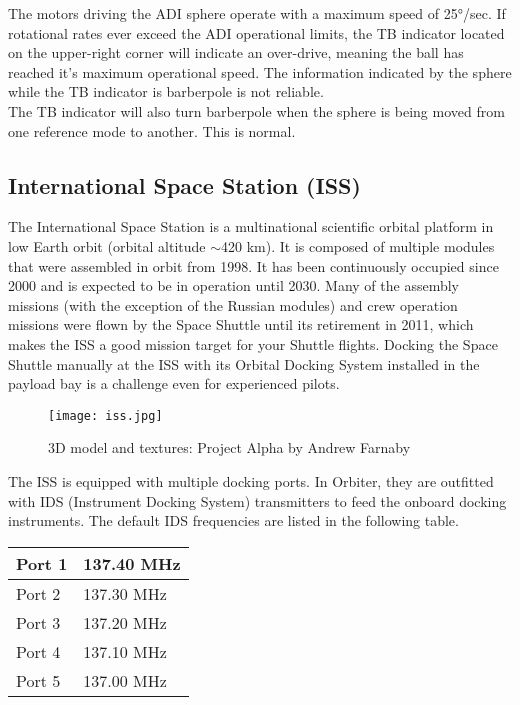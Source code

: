 \documentclass[Orbiter User Manual.tex]{subfiles}
\begin{document}
\noindent
The motors driving the ADI sphere operate with a maximum speed of 25°/sec. If rotational rates ever exceed the ADI operational limits, the TB indicator located on the upper-right corner will indicate an over-drive, meaning the ball has reached it's maximum operational speed. The information indicated by the sphere while the TB indicator is barberpole is not reliable.\\
The TB indicator will also turn barberpole when the sphere is being moved from one reference mode to another. This is normal.





\subsection{International Space Station (ISS)}
The International Space Station is a multinational scientific orbital platform in low Earth orbit (orbital altitude $\sim$420 km). It is composed of multiple modules that were assembled in orbit from 1998. It has been continuously occupied since 2000 and is expected to be in operation until 2030. Many of the assembly missions (with the exception of the Russian modules) and crew operation missions were flown by the Space Shuttle until its retirement in 2011, which makes the ISS a good mission target for your Shuttle flights. Docking the Space Shuttle manually at the ISS with its Orbital Docking System installed in the payload bay is a challenge even for experienced pilots.

\begin{figure}[H]
  \centering
  \texttt{[image: iss.jpg]}
  \caption{3D model and textures: Project Alpha by Andrew Farnaby}
\end{figure}

\noindent
The ISS is equipped with multiple docking ports. In Orbiter, they are outfitted with IDS (Instrument Docking System) transmitters to feed the onboard docking instruments. The default IDS frequencies are listed in the following table.

	\begin{longtable}{ |p{}|p{}| }
	\hline\rule{0pt}{2ex}
	Port 1 & 137.40  MHz\\
	\hline\rule{0pt}{2ex}
	Port 2 & 137.30  MHz\\
	\hline\rule{0pt}{2ex}
	Port 3 & 137.20  MHz\\
	\hline\rule{0pt}{2ex}
	Port 4 & 137.10  MHz\\
	\hline\rule{0pt}{2ex}
	Port 5 & 137.00  MHz\\
	\hline
	\end{longtable}
\end{document}
